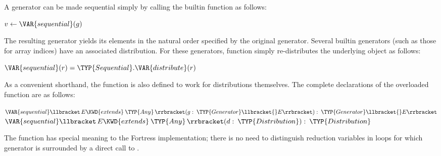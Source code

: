 A generator  can be made sequential simply by calling the builtin function  as follows:
\begin{Fortress}
\(v \leftarrow \VAR{sequential}(g)\)
\end{Fortress}
The resulting generator yields its elements in the natural order
specified by the original generator.  Several builtin generators (such
as those for array indices) have an associated distribution.  For
these generators,  function simply re-distributes the
underlying object as follows:
\begin{Fortress}
\(\VAR{sequential}(r) = \TYP{Sequential}.\VAR{distribute}(r)\)
\end{Fortress}
As a convenient shorthand, the  function is also
defined to work for distributions themselves.  The complete declarations of
the overloaded  function are as follows:
\begin{Fortress}
\(\VAR{sequential}\llbracket\,E \KWD{extends}\mskip 4mu plus 4mu\TYP{Any}\,\rrbracket(g \mathrel{\mathtt{:}}\mskip 4mu plus 4mu\TYP{Generator}\llbracket{}E\rrbracket) \mathrel{\mathtt{:}}\mskip 4mu plus 4mu\TYP{Generator}\llbracket{}E\rrbracket\)\\
\(\VAR{sequential}\llbracket\,E \KWD{extends}\mskip 4mu plus 4mu\TYP{Any}\,\rrbracket(d \mathrel{\mathtt{:}}\mskip 4mu plus 4mu\TYP{Distribution}) \mathrel{\mathtt{:}}\mskip 4mu plus 4mu\TYP{Distribution}\)
\end{Fortress}
The  function has special meaning to the Fortress
implementation; there is no need to distinguish reduction variables in
loops for which generator is surrounded by a direct call to
.
